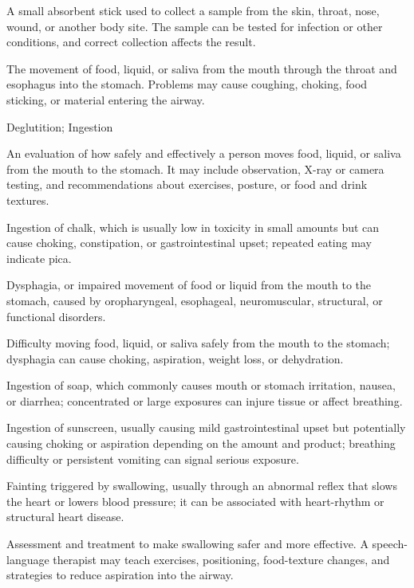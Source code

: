  A small absorbent stick used to collect a sample from the skin, throat, nose, wound, or another body site. The sample can be tested for infection or other conditions, and correct collection affects the result.

 The movement of food, liquid, or saliva from the mouth through the throat and esophagus into the stomach. Problems may cause coughing, choking, food sticking, or material entering the airway.

\synonyms
Deglutition; Ingestion

 An evaluation of how safely and effectively a person moves food, liquid, or saliva from the mouth to the stomach. It may include observation, X-ray or camera testing, and recommendations about exercises, posture, or food and drink textures.

 Ingestion of chalk, which is usually low in toxicity in small amounts but can cause choking, constipation, or gastrointestinal upset; repeated eating may indicate pica.

 Dysphagia, or impaired movement of food or liquid from the mouth to the stomach, caused by oropharyngeal, esophageal, neuromuscular, structural, or functional disorders.

 Difficulty moving food, liquid, or saliva safely from the mouth to the stomach; dysphagia can cause choking, aspiration, weight loss, or dehydration.

 Ingestion of soap, which commonly causes mouth or stomach irritation, nausea, or diarrhea; concentrated or large exposures can injure tissue or affect breathing.

 Ingestion of sunscreen, usually causing mild gastrointestinal upset but potentially causing choking or aspiration depending on the amount and product; breathing difficulty or persistent vomiting can signal serious exposure.

 Fainting triggered by swallowing, usually through an abnormal reflex that slows the heart or lowers blood pressure; it can be associated with heart-rhythm or structural heart disease.

 Assessment and treatment to make swallowing safer and more effective. A speech-language therapist may teach exercises, positioning, food-texture changes, and strategies to reduce aspiration into the airway.

